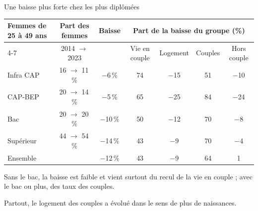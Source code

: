 \documentclass[10pt,aspectratio=169]{beamer}
\begin{document}
\begin{frame}{Une baisse plus forte chez les plus diplômées}
  \centering\scriptsize\setlength{\tabcolsep}{5pt}
  \begin{tabular}{@{}lcccccc@{}}
    \toprule
    Femmes de 25 à 49 ans & Part des femmes & Baisse & \multicolumn{4}{c}{Part de la baisse du groupe (\%)} \\
    \cmidrule(l){4-7}
     & 2014 $\to$ 2023 & & Vie en couple & Logement & Couples & Hors couple \\
    \midrule
    Infra CAP & 16 $\to$ 11\,\% & $-$6\,\% & 74 & $-$15 & 51 & $-$10 \\
    CAP-BEP & 20 $\to$ 14\,\% & $-$5\,\% & 65 & $-$25 & 84 & $-$24 \\
    Bac & 20 $\to$ 20\,\% & $-$10\,\% & 50 & $-$12 & 70 & $-$8 \\
    Supérieur & 44 $\to$ 54\,\% & $-$14\,\% & 43 & $-$9 & 70 & $-$4 \\
    \midrule
    Ensemble & & $-$12\,\% & 43 & $-$9 & 64 & 1 \\
    \bottomrule
  \end{tabular}
  \vspace{0.3cm}

  \raggedright\small
  \begin{aere}
    \item Sans le bac, la baisse est faible et vient surtout du recul de la vie en couple ; avec le bac ou plus, des \alert{taux des couples}.
    \item Partout, le logement des couples a évolué dans le sens de plus de naissances.
  \end{aere}
\end{frame}
\end{document}
